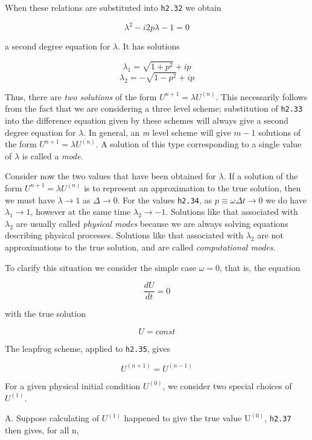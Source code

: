 When these relations are substituted into \texttt{h2.32} we obtain

\[\lambda^{2} - i2p\lambda - 1 = 0\]

a second degree equation for \(\lambda\). It has solutions

\[\lambda_{1} = \sqrt{1 + p^{2}} + i p\]\[\lambda_{2} = - \sqrt{1 - p^{2}} + i p\]

Thus, there are \emph{two solutions} of the form
\(U^{n + 1} = \lambda U^{( n )}\). This necessarily follows from the
fact that we are considering a three level scheme; substitution of
\texttt{h2.33} into the difference equation given by these schemes will
always give a second degree equation for \(\lambda\). In general, an
\emph{m} level scheme will give $m-1$ solutions of the form
\(U^{n + 1} = \lambda U^{\left( n \right)}\). A solution of this type
corresponding to a single value of \(\lambda\) is called a \emph{mode}.

Consider now the two values that have been obtained for \(\lambda\). If
a solution of the form \(U^{n + 1} = \lambda U^{\left( n \right)}\) is
to represent an approximation to the true solution, then we must have
\(\lambda \rightarrow 1\) as \(\Delta \rightarrow 0\). For the values
\texttt{h2.34}, as \(p \equiv \omega\Delta t \rightarrow 0\) we do have
\(\lambda_{1} \rightarrow 1\), however at the same time
\(\lambda_{2} \rightarrow - 1\). Solutions like that associated with
\(\lambda_{2}\) are usually called \emph{physical modes} because we are
always solving equations describing physical processes. Solutions like
that associated with \(\lambda_2\) are not approximations to the true
solution, and are called \emph{computational modes}.

To clarify this situation we consider the simple case \(\omega = 0\),
that is, the equation

\[\frac{d U}{d t} = 0\]

with the true solution

\[U = const\]

The leapfrog scheme, applied to \texttt{h2.35}, gives

\[U^{\left( n + 1 \right)} = U^{\left( n - 1 \right)}\]

For a given physical initial condition \(U^{\left( 0 \right)}\), we
consider two special choices of \(U^{\left( 1 \right)}\).

A. Suppose calculating of \(U^{\left( 1 \right)}\) happened to give the
true value \(\text{U}^{\left( 0 \right)}\), \texttt{h2.37} then gives,
for all n,

